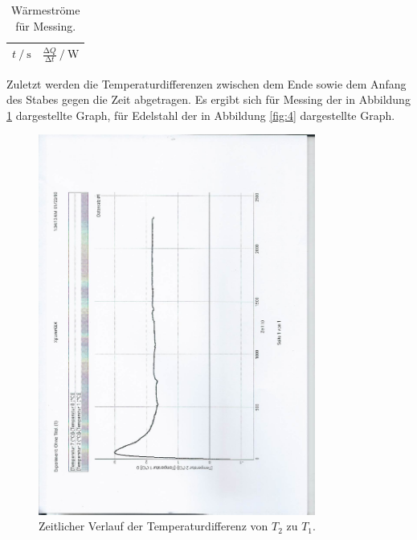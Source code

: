 \begin{table}
  \centering
  \caption{Wärmeströme für Messing.}
  \label{tab:2}
  \begin{tabular}{c c}
    \toprule
    {$t \:/\: \si{\second}$} & {$\frac{\increment{Q}}{\increment{t}} \:/\: \si{\watt}$}\\
    \midrule
    
    \bottomrule
  \end{tabular}
\end{table}

Zuletzt werden die Temperaturdifferenzen zwischen dem Ende sowie dem Anfang des Stabes gegen die Zeit abgetragen.
Es ergibt sich für Messing der in Abbildung \ref{fig:3} dargestellte Graph, für Edelstahl der in Abbildung \ref{fig:4} dargestellte Graph.
\begin{figure}[H]
  \centering
  \includegraphics[height=12.5cm, angle=270]{scan-4.jpg}
  \caption{Zeitlicher Verlauf der Temperaturdifferenz von $T_2$ zu $T_1$.}
  \label{fig:3}
\end{figure}

